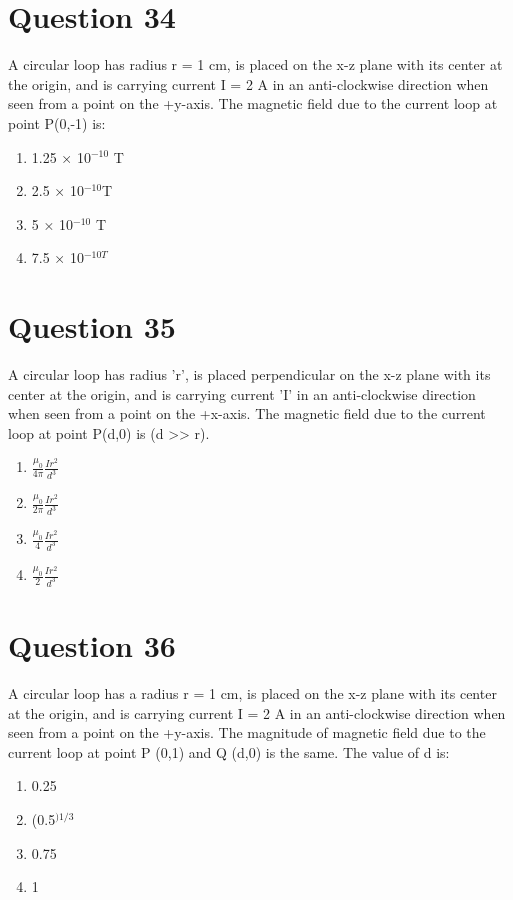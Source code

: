 \documentclass{article}
\begin{document}
\section*{Question 34}
A circular loop has radius r = 1 cm, is placed on the x-z plane with its center at the origin, and is carrying current I = 2 A in an anti-clockwise direction when seen from a point on the +y-axis. The magnetic field due to the current loop at point P(0,-1) is:
\begin{enumerate}[label=(\alph*)]
\item 1.25 × 10$^{-10}$ T
\item 2.5 × 10$^{-10 }$T
\item 5 × 10$^{-10}$ T
\item 7.5 × 10$^{-10 T}$
\end{enumerate}
\newpage
\section*{Question 35}
A circular loop has radius 'r', is placed perpendicular on the x-z plane with its center at the origin, and is carrying current 'I' in an anti-clockwise direction when seen from a point on the +x-axis. The magnetic field due to the current loop at point P(d,0) is (d >> r).
\begin{enumerate}[label=(\alph*)]
\item \(\frac{\mu_0}{4 \pi} \frac{I r^2}{d^3} \)
\item \(\frac{\mu_0}{2 \pi} \frac{I r^2}{d^3}\)
\item \(\frac{\mu_0}{4} \frac{I r^2}{d^3}\)
\item \(\frac{\mu_0}{2} \frac{I r^2}{d^3}\)
\end{enumerate}
\newpage
\section*{Question 36}
A circular loop has a radius r = 1 cm, is placed on the x-z plane with its center at the origin, and is carrying current I = 2 A in an anti-clockwise direction when seen from a point on the +y-axis. The magnitude of magnetic field due to the current loop at point P (0,1) and Q (d,0) is the same. The value of d is:
\begin{enumerate}[label=(\alph*)]
\item 0.25
\item (0.5$^{)1/3}$
\item 0.75 
\item 1
\end{enumerate}
\newpage
\end{document}
